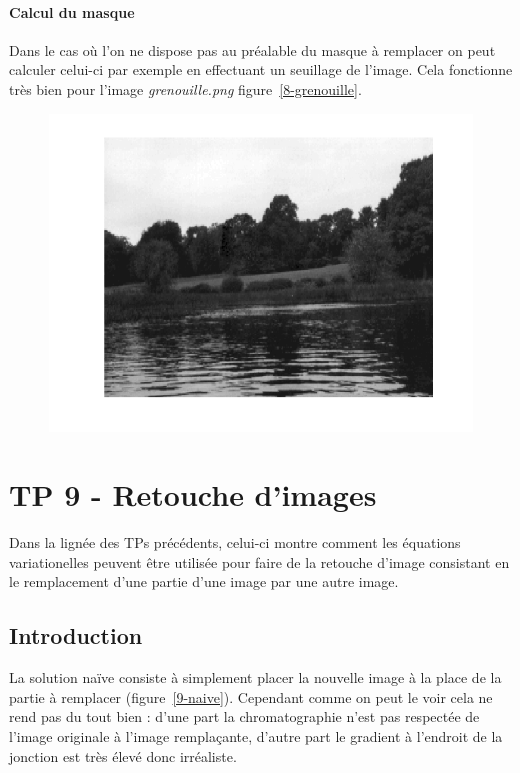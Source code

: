 \documentclass{article}
\begin{document}
\paragraph{Calcul du masque}
Dans le cas où l'on ne dispose pas au préalable du masque à remplacer on peut calculer celui-ci par exemple en effectuant un seuillage de l'image. Cela fonctionne très bien pour l'image \emph{grenouille.png} figure~\ref{8-grenouille}.

\begin{figure}[!ht]
\includegraphics[width=\textwidth]{images/1/1-1-autumn_b.png}
\end{figure}

\section{TP 9 - Retouche d'images}
Dans la lignée des TPs précédents, celui-ci montre comment les équations variationelles peuvent être utilisée pour faire de la retouche d'image consistant en le remplacement d'une partie d'une image par une autre image.

\subsection{Introduction}
La solution naïve consiste à simplement placer la nouvelle image à la place de la partie à remplacer (figure~\ref{9-naive}). Cependant comme on peut le voir cela ne rend pas du tout bien : d'une part la chromatographie n'est pas respectée de l'image originale à l'image remplaçante, d'autre part le gradient à l'endroit de la jonction est très élevé donc irréaliste.
\end{document}
